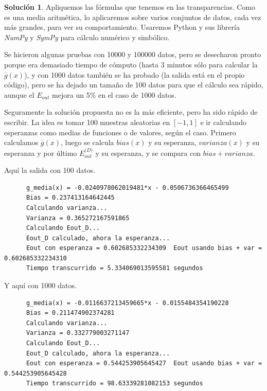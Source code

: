 \documentclass[a4paper, 11pt]{article}
\theoremstyle{definition}
\newtheorem*{solucion}{Solución}
\begin{document}
  \begin{solucion}
    Apliquemos las fórmulas que tenemos en las transparencias. Como es una media aritmética, lo aplicaremos sobre varios conjuntos de datos, cada vez más grandes, para ver su comportamiento. Usaremos Python y sus librería \emph{NumPy} y \emph{SymPy} para cálculo numérico y simbólico.

    Se hicieron algunas pruebas con 10000 y 100000 datos, pero se desecharon pronto porque era demasiado tiempo de cómputo (hasta 3 minutos sólo para calcular la $\overline{g}(x)$), y con 1000 datos también se ha probado (la salida está en el propio código), pero se ha dejado un tamaño de 100 datos para que el cálculo sea rápido, aunque el $E_{out}$ mejora un 5\% en el caso de 1000 datos.

    Seguramente la solución propuesta no es la más eficiente, pero ha sido rápido de escribir. La idea es tomar 100 muestras aleatorias en $[-1,1]$ e ir calculando esperanzas como medias de funciones o de valores, según el caso. Primero calculamos $\overline{g}(x)$, luego se calcula $bias(x)$ y su esperanza, $varianza(x)$ y su esperanza y por último $E_{out}^{\mathcal(D)}$ y su esperanza, y se compara con $bias+varianza$.

    

    Aquí la salida con 100 datos.

    \begin{verbatim}
      g_media(x) = -0.0240978062019481*x - 0.0506736366465499
      Bias = 0.237413164642445
      Calculando varianza...
      Varianza = 0.365272167591865
      Calculando Eout_D...
      Eout_D calculado, ahora la esperanza...
      Eout con esperanza = 0.602685332234309  Eout usando bias + var = 0.602685332234310
      Tiempo transcurrido = 5.334069013595581 segundos
    \end{verbatim}


    Y aquí con 1000 datos.

    \begin{verbatim}
      g_media(x) = -0.0116637213459665*x - 0.0155484354190228
      Bias = 0.211474902374281
      Calculando varianza...
      Varianza = 0.332779003271147
      Calculando Eout_D...
      Eout_D calculado, ahora la esperanza...
      Eout con esperanza = 0.544253905645427  Eout usando bias + var = 0.544253905645428
      Tiempo transcurrido = 98.63339281082153 segundos

    \end{verbatim}


\end{solucion}
\end{document}
